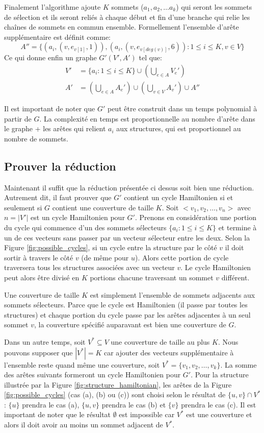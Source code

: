 \documentclass[../main.tex]{subfiles}
\begin{document}
Finalement l'algorithme ajoute $K$ sommets ($a_1, a_2, \dots a_k$) qui seront les \og sommets de sélection \fg{} et ils seront reliés à chaque début et fin d'une branche qui relie les \og chaînes \fg{} de sommets en commun ensemble. Formellement l'ensemble d'arête supplémentaire est définit comme:
\[
A'' = \{(a_i, (v, e_{v[1]}, 1)), (a_i, (v, e_{v[deg(v)]}, 6)): 1 \leq i \leq K, v \in V \}
\]  
Ce qui donne enfin un graphe $G'(V',A')$ tel que:
\begin{align*}
V' &= \{ a_i: 1 \leq i \leq K \} \cup \left( \bigcup_{e \in A} V_e' \right)\\
A' &= \left( \bigcup_{e \in A} A_e' \right) \cup \left( \bigcup_{v \in V} A_v' \right) \cup A''
\end{align*}

Il est important de noter que $G'$ peut être construit dans un temps polynomial à partir de $G$. La complexité en temps est proportionnelle au nombre d'arête dans le graphe + les arêtes qui relient $a_i$ aux structures, qui est proportionnel au nombre de sommets.

\subsection{Prouver la réduction}
Maintenant il suffit que la réduction présentée ci dessus soit bien une réduction. Autrement dit, il faut prouver que $G'$ contient un cycle Hamiltonien si et seulement si $G$ contient une couverture de taille $K$. Soit $<v_1, v_2, \dots , v_n>$ avec $n = |V'|$ est un cycle Hamiltonien pour $G'$. Prenons en considération une portion du cycle qui commence d'un des sommets sélecteurs $\{a_i: 1 \leq i \leq K \}$ et termine à un de ces vecteurs sans passer par un vecteur sélecteur entre les deux. Selon la Figure \ref{fig:possible_cycles}, si un cycle entre la structure par le côté $v$ il doit sortir à travers le côté $v$ (de même pour $u$). Alors cette portion de cycle traversera tous les structures associées avec un vecteur $v$. Le cycle Hamiltonien peut alors être divisé en $K$ portions chacune traversant un sommet $v$ différent.

Une couverture de taille $K$ est simplement l'ensemble de sommets adjacents aux sommets sélecteurs. Parce que le cycle est Hamiltonien (il passe par toutes les structures) et chaque portion du cycle passe par les arêtes adjacentes à un seul sommet $v$, la couverture spécifié auparavant est bien une couverture de $G$.

Dans un autre temps, soit $V^* \subseteq V$ une couverture de taille au plus $K$. Nous pouvons supposer que $|V^*| = K$ car ajouter des vecteurs supplémentaire à l'ensemble reste quand même une couverture, soit $V^* = \{v_1, v_2, \dots , v_k \}$. La somme des arêtes suivants formeront un cycle Hamiltonien pour $G'$. Pour la structure illustrée par la Figure \ref{fig:structure_hamiltonian}, les arêtes de la Figure \ref{fig:possible_cycles} (cas (a), (b) ou (c)) sont choisi selon le résultat de $\{u ,v\} \cap V^*$: $\{u\}$ prendra le cas (a), $\{u,v\}$ prendra le cas (b) et $\{v\}$ prendra le cas (c). Il est important de noter que le résultat $\emptyset$ est impossible car $V^*$ est une couverture et alors il doit avoir au moins un sommet adjacent de $V^*$.
\end{document}
